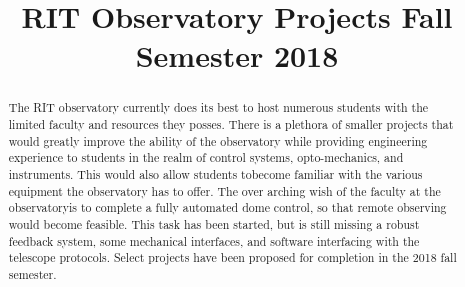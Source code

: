 \documentclass[conference]{IEEEtran} %
\title{RIT Observatory Projects Fall Semester 2018}
\author{
  \IEEEauthorblockN{%
    Amber~Dubill\IEEEauthorrefmark{1},
    Dr. Jennifer Connelly\IEEEauthorrefmark{2},
    and
    Dr. Micheal Richmond\IEEEauthorrefmark{3},
  }
  \IEEEauthorblockA{%
    RIT Space Exploration, Rochester Institute of Technology \\ %
    Rochester, N.Y. \\
    Email:
    \IEEEauthorrefmark{1}ald4035@rit.edu,
    \IEEEauthorrefmark{2}jlcsps@rit.edu,
    \IEEEauthorrefmark{3}mwrsps@rit.edu,
  }

}
\begin{document}
\maketitle%

\begin{abstract}
  The RIT observatory currently does its best to host numerous students with the limited faculty and resources they posses.
  There is a plethora of smaller projects that would greatly improve the ability of the observatory while providing engineering experience to students in the realm of control systems, opto-mechanics, and instruments.
  This would also allow students tobecome familiar with the various equipment the observatory has to offer.
  The over arching wish of the faculty at the observatoryis to complete a fully automated dome control, so that remote observing would become feasible.
  This task has been started, but is still missing a robust feedback system, some mechanical interfaces, and software interfacing with the telescope protocols.
  Select projects have been proposed for completion in the 2018 fall semester.

\end{abstract}

\label{sec:nomenclature}
\newcommand{\nomunit}[1]{%
\renewcommand{\nomentryend}{\hspace*{\fill}#1}}
\renewcommand{\nompreamble}{

  }
\printnomenclature{}
\end{document}
